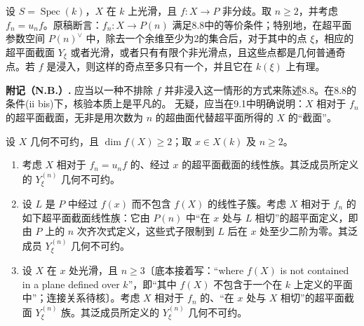 \medskip
{}
设 $S=\operatorname{Spec}(k)$，$X$ 在 $k$ 上光滑，且 $f:X\to P$ 非分歧。取 $n\ge2$，并考虑 $f_n=u_n f$。原稿断言：$f_n:X\to P(n)$ 满足8.8中的等价条件；特别地，在超平面参数空间 $P(n)^\vee$ 中，除去一个余维至少为2的集合后，对于其中的点 $\xi$，相应的超平面截面 $Y_\xi$ 或者光滑，或者只有有限个非光滑点，且这些点都是几何普通奇点。若 $f$ 是浸入，则这样的奇点至多只有一个，并且它在 $k(\xi)$ 上有理。

\medskip
\noindent\textbf{附记（N.B.）.}
应当以一种不排除 $f$ 并非浸入这一情形的方式来陈述8.8。在8.8的条件(ii bis)下，核验本质上是平凡的。
无疑，应当在9.1中明确说明：$X$ 相对于 $f_n$ 的超平面截面，无非是用次数为 $n$ 的超曲面代替超平面所得的 $X$ 的“截面”。


设 $X$ 几何不可约，且 $\dim f(X)\ge2$；取 $x\in X(k)$ 及 $n\ge2$。
\begin{enumerate}
\item[(a)] 考虑 $X$ 相对于 $f_n=u_n f$ 的、经过 $x$ 的超平面截面的线性族。其泛成员所定义的 $Y^{(n)}_\xi$ 几何不可约。
\item[(b)] 设 $L$ 是 $P$ 中经过 $f(x)$ 而不包含 $f(X)$ 的线性子簇。考虑 $X$ 相对于 $f_n$ 的如下超平面截面线性族：它由 $P(n)$ 中“在 $x$ 处与 $L$ 相切”的超平面定义，即由 $P$ 上的 $n$ 次齐次式定义，这些式子限制到 $L$ 后在 $x$ 处至少二阶为零。其泛成员 $Y^{(n)}_\xi$ 几何不可约。
\item[(c)] 设 $X$ 在 $x$ 处光滑，且 $n\ge3$〔底本接着写：“where $f(X)$ is not contained in a plane defined over $k$”，即“其中 $f(X)$ 不包含于一个在 $k$ 上定义的平面中”；连接关系待核〕。考虑 $X$ 相对于 $f_n$ 的、“在 $x$ 处与 $X$ 相切”的超平面截面 $Y^{(n)}_\xi$ 族。其泛成员所定义的 $Y^{(n)}_\xi$ 几何不可约。
\end{enumerate}

